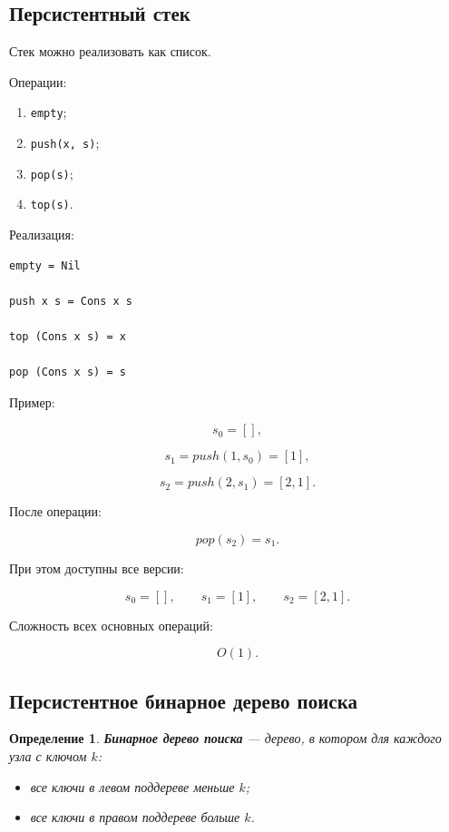 \documentclass[12pt,a4paper]{article}
\newtheorem{definition}{Определение}
\begin{document}
\subsection{Персистентный стек}

Стек можно реализовать как список.

Операции:

\begin{enumerate}
  \item \texttt{empty};
  \item \texttt{push(x, s)};
  \item \texttt{pop(s)};
  \item \texttt{top(s)}.
\end{enumerate}

Реализация:

\begin{lstlisting}
empty = Nil

push x s = Cons x s

top (Cons x s) = x

pop (Cons x s) = s
\end{lstlisting}

Пример:

\[
s_0 = [],
\]

\[
s_1 = push(1,s_0) = [1],
\]

\[
s_2 = push(2,s_1) = [2,1].
\]

После операции:

\[
pop(s_2) = s_1.
\]

При этом доступны все версии:

\[
s_0 = [], \qquad s_1 = [1], \qquad s_2 = [2,1].
\]

Сложность всех основных операций:

\[
O(1).
\]

\subsection{Персистентное бинарное дерево поиска}

\begin{definition}
\textbf{Бинарное дерево поиска} --- дерево, в котором для каждого узла с ключом $k$:
\begin{itemize}
  \item все ключи в левом поддереве меньше $k$;
  \item все ключи в правом поддереве больше $k$.
\end{itemize}
\end{definition}
\end{document}
